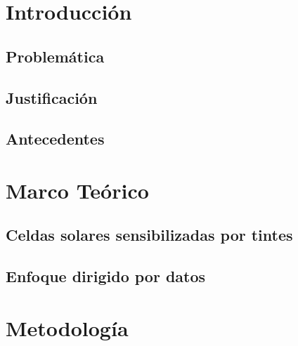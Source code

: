 \documentclass{article}
\theoremstyle{mytheoremstyle}
\theoremstyle{mytheoremstyle}
\theoremstyle{myproblemstyle}
\begin{document}
    \newpage
    \section{Introducción}
    \subsection{Problemática}
    
    \subsection{Justificación}
    
    \subsection{Antecedentes}
    
    \section{Marco Teórico}
    \subsection{Celdas solares sensibilizadas por tintes}
    
    \subsection{Enfoque dirigido por datos}
    
    \section{Metodología}
    


    \printbibliography
\end{document}
